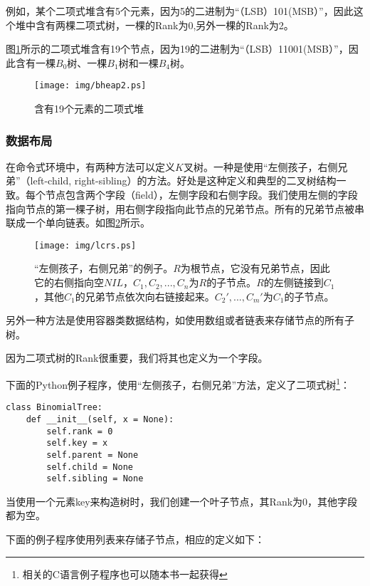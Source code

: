 \documentclass[UTF8]{article}
\begin{document}
例如，某个二项式堆含有5个元素，因为5的二进制为“（LSB）101(MSB）”，因此这个堆中含有两棵二项式树，一棵的Rank为0,另外一棵的Rank为2。

图\ref{fig:bheap2}所示的二项式堆含有19个节点，因为19的二进制为“（LSB）11001(MSB）”，因此含有一棵$B_0$树、一棵$B_1$树和一棵$B_4$树。

\begin{figure}[htbp]
  \centering
  \texttt{[image: img/bheap2.ps]}
  \caption{含有19个元素的二项式堆} \label{fig:bheap2}
\end{figure}

\subsubsection{数据布局}

在命令式环境中，有两种方法可以定义$K$叉树。一种是使用“左侧孩子，右侧兄弟”（left-child, right-sibling）的方法\cite{CLRS}。好处是这种定义和典型的二叉树结构一致。每个节点包含两个字段（field），左侧字段和右侧字段。我们使用左侧的字段指向节点的第一棵子树，用右侧字段指向此节点的兄弟节点。所有的兄弟节点被串联成一个单向链表。如图\ref{fig:lcrs}所示。

\begin{figure}[htbp]
  \centering
  \texttt{[image: img/lcrs.ps]}
  \caption{“左侧孩子，右侧兄弟”的例子。$R$为根节点，它没有兄弟节点，因此它的右侧指向空$NIL$，$C_1, C_2, ..., C_n$为$R$的子节点。$R$的左侧链接到$C_1$，其他$C_1$的兄弟节点依次向右链接起来。$C_2', ..., C_m'$为$C_1$的子节点。} \label{fig:lcrs}
\end{figure}

另外一种方法是使用容器类数据结构，如使用数组或者链表来存储节点的所有子树。

因为二项式树的Rank很重要，我们将其也定义为一个字段。

下面的Python例子程序，使用“左侧孩子，右侧兄弟”方法，定义了二项式树\footnote{相关的C语言例子程序也可以随本书一起获得}：

\lstset{language=Python}
\begin{lstlisting}
class BinomialTree:
    def __init__(self, x = None):
        self.rank = 0
        self.key = x
        self.parent = None
        self.child = None
        self.sibling = None
\end{lstlisting}

当使用一个元素key来构造树时，我们创建一个叶子节点，其Rank为0，其他字段都为空。

下面的例子程序使用列表来存储子节点，相应的定义如下：
\end{document}
